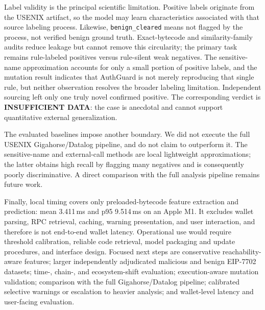 Label validity is the principal scientific limitation. Positive labels originate from the USENIX artifact, so the model may learn characteristics associated with that source labeling process. Likewise, \texttt{benign\_cleared} means not flagged by the process, not verified benign ground truth. Exact-bytecode and similarity-family audits reduce leakage but cannot remove this circularity; the primary task remains rule-labeled positives versus rule-silent weak negatives. The sensitive-name approximation accounts for only a small portion of positive labels, and the mutation result indicates that AuthGuard is not merely reproducing that single rule, but neither observation resolves the broader labeling limitation. Independent sourcing left only one truly novel confirmed positive. The corresponding verdict is \textbf{INSUFFICIENT DATA}: the case is anecdotal and cannot support quantitative external generalization.

The evaluated baselines impose another boundary. We did not execute the full USENIX Gigahorse/Datalog pipeline, and do not claim to outperform it. The sensitive-name and external-call methods are local lightweight approximations; the latter obtains high recall by flagging many negatives and is consequently poorly discriminative. A direct comparison with the full analysis pipeline remains future work.

Finally, local timing covers only preloaded-bytecode feature extraction and prediction: mean 3.411\,ms and p95 9.514\,ms on an Apple M1. It excludes wallet parsing, RPC retrieval, caching, warning presentation, and user interaction, and therefore is not end-to-end wallet latency. Operational use would require threshold calibration, reliable code retrieval, model packaging and update procedures, and interface design. Focused next steps are conservative reachability-aware features; larger independently adjudicated malicious and benign EIP-7702 datasets; time-, chain-, and ecosystem-shift evaluation; execution-aware mutation validation; comparison with the full Gigahorse/Datalog pipeline; calibrated selective warnings or escalation to heavier analysis; and wallet-level latency and user-facing evaluation.
